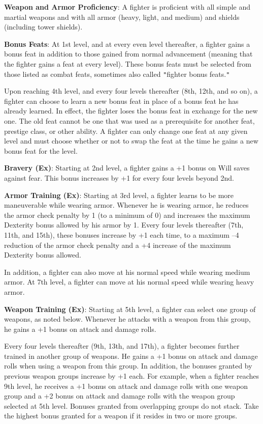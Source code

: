 \textbf{Weapon and Armor Proficiency}: A fighter is proficient with all simple and martial weapons and with all armor (heavy, light, and medium) and shields (including tower shields).
				
\textbf{Bonus Feats}: At 1st level, and at every even level thereafter, a fighter gains a bonus feat in addition to those gained from normal advancement (meaning that the fighter gains a feat at every level). These bonus feats must be selected from those listed as combat feats, sometimes also called \texttt{{}"{}}fighter bonus feats.\texttt{{}"{}}
				
Upon reaching 4th level, and every four levels thereafter (8th, 12th, and so on), a fighter can choose to learn a new bonus feat in place of a bonus feat he has already learned. In effect, the fighter loses the bonus feat in exchange for the new one. The old feat cannot be one that was used as a prerequisite for another feat, prestige class, or other ability. A fighter can only change one feat at any given level and must choose whether or not to swap the feat at the time he gains a new bonus feat for the level.
				
\textbf{Bravery (Ex)}: Starting at 2nd level, a fighter gains a +1 bonus on Will saves against fear. This bonus increases by +1 for every four levels beyond 2nd.
				
\textbf{Armor Training (Ex)}: Starting at 3rd level, a fighter learns to be more maneuverable while wearing armor. Whenever he is wearing armor, he reduces the armor check penalty by 1 (to a minimum of 0) and increases the maximum Dexterity bonus allowed by his armor by 1. Every four levels thereafter (7th, 11th, and 15th), these bonuses increase by +1 each time, to a maximum --4 reduction of the armor check penalty and a +4 increase of the maximum Dexterity bonus allowed.
				
In addition, a fighter can also move at his normal speed while wearing medium armor. At 7th level, a fighter can move at his normal speed while wearing heavy armor.
				
\textbf{Weapon Training (Ex)}: Starting at 5th level, a fighter can select one group of weapons, as noted below. Whenever he attacks with a weapon from this group, he gains a +1 bonus on attack and damage rolls.
				
Every four levels thereafter (9th, 13th, and 17th), a fighter becomes further trained in another group of weapons. He gains a +1 bonus on attack and damage rolls when using a weapon from this group. In addition, the bonuses granted by previous weapon groups increase by +1 each. For example, when a fighter reaches 9th level, he receives a +1 bonus on attack and damage rolls with one weapon group and a +2 bonus on attack and damage rolls with the weapon group selected at 5th level. Bonuses granted from overlapping groups do not stack. Take the highest bonus granted for a weapon if it resides in two or more groups.
				
